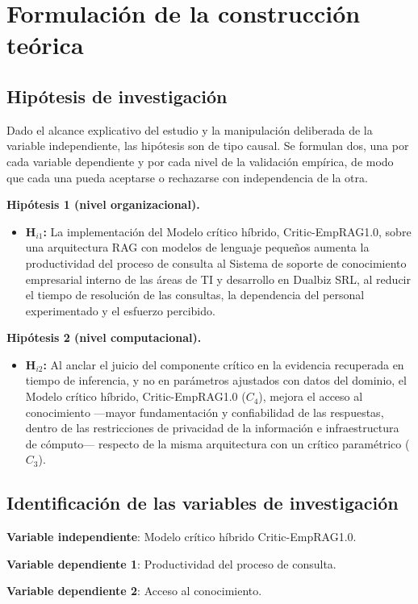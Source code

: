 \section{Formulación de la construcción teórica}

\subsection{Hipótesis de investigación}

Dado el alcance explicativo del estudio y la manipulación deliberada de la variable independiente, las hipótesis son de tipo causal. Se formulan dos, una por cada variable dependiente y por cada nivel de la validación empírica, de modo que cada una pueda aceptarse o rechazarse con independencia de la otra.

\textbf{Hipótesis 1 (nivel organizacional).}

\begin{itemize}
	\item \textbf{H$_{i1}$:} La implementación del Modelo crítico híbrido, Critic-EmpRAG1.0, sobre una arquitectura RAG con modelos de lenguaje pequeños aumenta la productividad del proceso de consulta al Sistema de soporte de conocimiento empresarial interno de las áreas de TI y desarrollo en Dualbiz SRL, al reducir el tiempo de resolución de las consultas, la dependencia del personal experimentado y el esfuerzo percibido.
	
\end{itemize}

\textbf{Hipótesis 2 (nivel computacional).}

\begin{itemize}
	\item \textbf{H$_{i2}$:} Al anclar el juicio del componente crítico en la evidencia recuperada en tiempo de inferencia, y no en parámetros ajustados con datos del dominio, el Modelo crítico híbrido, Critic-EmpRAG1.0 ($C_4$), mejora el acceso al conocimiento ---mayor fundamentación y confiabilidad de las respuestas, dentro de las restricciones de privacidad de la información e infraestructura de cómputo--- respecto de la misma arquitectura con un crítico paramétrico ($C_3$).
	
\end{itemize}

\subsection{Identificación de las variables de investigación}

\textbf{Variable independiente}: Modelo crítico híbrido Critic-EmpRAG1.0.

\textbf{Variable dependiente 1}: Productividad del proceso de consulta.

\textbf{Variable dependiente 2}: Acceso al conocimiento.




\newpage
